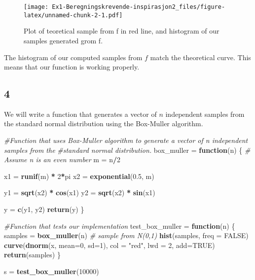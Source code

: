 \documentclass[
]{article}
\newenvironment{Shaded}{\begin{snugshade}}{\end{snugshade}}
\newcommand{\CommentTok}[1]{\textcolor[rgb]{0.56,0.35,0.01}{\textit{#1}}}
\newcommand{\ControlFlowTok}[1]{\textcolor[rgb]{0.13,0.29,0.53}{\textbf{#1}}}
\newcommand{\DataTypeTok}[1]{\textcolor[rgb]{0.13,0.29,0.53}{#1}}
\newcommand{\DecValTok}[1]{\textcolor[rgb]{0.00,0.00,0.81}{#1}}
\newcommand{\FloatTok}[1]{\textcolor[rgb]{0.00,0.00,0.81}{#1}}
\newcommand{\KeywordTok}[1]{\textcolor[rgb]{0.13,0.29,0.53}{\textbf{#1}}}
\newcommand{\NormalTok}[1]{#1}
\newcommand{\OperatorTok}[1]{\textcolor[rgb]{0.81,0.36,0.00}{\textbf{#1}}}
\newcommand{\OtherTok}[1]{\textcolor[rgb]{0.56,0.35,0.01}{#1}}
\newcommand{\StringTok}[1]{\textcolor[rgb]{0.31,0.60,0.02}{#1}}
\begin{document}
\begin{figure}
\centering
\texttt{[image: Ex1-Beregningskrevende-inspirasjon2\_files/figure-latex/unnamed-chunk-2-1.pdf]}
\caption{Plot of teoretical sample from f in red line, and histogram of
our samples generated grom f.}
\end{figure}

The histogram of our computed samples from \(f\) match the theoretical
curve. This means that our function is working properly.

\hypertarget{section-1}{%
\subsection{4}\label{section-1}}

We will write a function that generates a vector of \(n\) independent
samples from the standard normal distribution using the Box-Muller
algorithm.

\begin{Shaded}
\begin{Highlighting}[]
\CommentTok{#Function that uses Box-Muller algorithm to generate a vector of n independent samples from the }
\CommentTok{#standard normal distribution.}
\NormalTok{box_muller =}\StringTok{ }\ControlFlowTok{function}\NormalTok{(n) \{}
  \CommentTok{# Assume n is an even number}
\NormalTok{  m =}\StringTok{ }\NormalTok{n}\OperatorTok{/}\DecValTok{2}
  
\NormalTok{  x1 =}\StringTok{ }\KeywordTok{runif}\NormalTok{(m) }\OperatorTok{*}\StringTok{ }\DecValTok{2}\OperatorTok{*}\NormalTok{pi}
\NormalTok{  x2 =}\StringTok{ }\KeywordTok{exponential}\NormalTok{(}\FloatTok{0.5}\NormalTok{, m)}
  
\NormalTok{  y1 =}\StringTok{ }\KeywordTok{sqrt}\NormalTok{(x2) }\OperatorTok{*}\StringTok{ }\KeywordTok{cos}\NormalTok{(x1)}
\NormalTok{  y2 =}\StringTok{ }\KeywordTok{sqrt}\NormalTok{(x2) }\OperatorTok{*}\StringTok{ }\KeywordTok{sin}\NormalTok{(x1)}
  
\NormalTok{  y =}\StringTok{ }\KeywordTok{c}\NormalTok{(y1, y2)}
  \KeywordTok{return}\NormalTok{(y)}
\NormalTok{\}}


\CommentTok{#Function that tests our implementation}
\NormalTok{test_box_muller =}\StringTok{ }\ControlFlowTok{function}\NormalTok{(n) \{}
\NormalTok{  samples =}\StringTok{ }\KeywordTok{box_muller}\NormalTok{(n) }\CommentTok{# sample from N(0,1)}
  \KeywordTok{hist}\NormalTok{(samples, }\DataTypeTok{freq =} \OtherTok{FALSE}\NormalTok{)}
  \KeywordTok{curve}\NormalTok{(}\KeywordTok{dnorm}\NormalTok{(x, }\DataTypeTok{mean=}\DecValTok{0}\NormalTok{, }\DataTypeTok{sd=}\DecValTok{1}\NormalTok{), }\DataTypeTok{col =} \StringTok{"red"}\NormalTok{, }\DataTypeTok{lwd =} \DecValTok{2}\NormalTok{, }\DataTypeTok{add=}\OtherTok{TRUE}\NormalTok{)}
  \KeywordTok{return}\NormalTok{(samples)}
\NormalTok{\}}

\NormalTok{s =}\StringTok{ }\KeywordTok{test_box_muller}\NormalTok{(}\DecValTok{10000}\NormalTok{)}
\end{Highlighting}
\end{Shaded}
\end{document}
